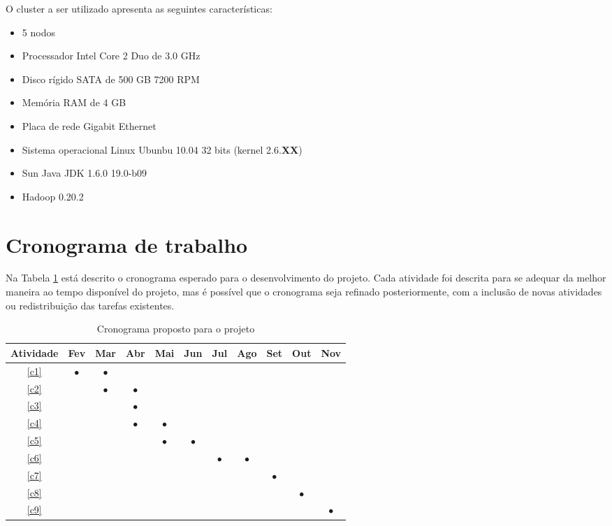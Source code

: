 O cluster a ser utilizado apresenta as seguintes características:
\begin{itemize}
\item 5 nodos
\item Processador Intel Core 2 Duo de 3.0 GHz
\item Disco rígido SATA de 500 GB 7200 RPM
\item Memória RAM de 4 GB
\item Placa de rede Gigabit Ethernet
\item Sistema operacional Linux Ubunbu 10.04 32 bits (kernel 2.6.\textbf{XX})
\item Sun Java JDK 1.6.0 19.0-b09 
\item Hadoop 0.20.2
\end{itemize}

\section{Cronograma de trabalho}

Na Tabela \ref{tab:cronograma} está descrito o cronograma esperado para o desenvolvimento do projeto. Cada atividade foi descrita para se adequar da melhor maneira ao tempo disponível do projeto, mas é possível que o cronograma seja refinado posteriormente, com a inclusão de novas atividades ou redistribuição das tarefas existentes. 

\begin{table}[h]
\begin{center}
\renewcommand{\arraystretch}{1}
\setlength\tabcolsep{3pt}

\begin{tabular}{| c | c | c | c | c | c | c | c | c | c | c |}
\hline
Atividade &Fev &Mar &Abr &Mai &Jun &Jul &Ago &Set &Out &Nov \\ \hline \hline

\ref{c1}   &$\bullet$ &$\bullet$ & & & & & & & & \\ \hline
\ref{c2}   & &$\bullet$ &$\bullet$ & & & & & & & \\ \hline
\ref{c3}   & & &$\bullet$ & & & & & & & \\ \hline
\ref{c4}   & & &$\bullet$ &$\bullet$ & & & & & & \\ \hline
\ref{c5}   & & & &$\bullet$ &$\bullet$ & & & & & \\ \hline
\ref{c6}   & & & & & &$\bullet$ &$\bullet$ & & & \\ \hline
\ref{c7}   & & & & & & & &$\bullet$ & & \\ \hline
\ref{c8}   & & & & & & & & &$\bullet$ & \\ \hline
\ref{c9}   & & & & & & & & & &$\bullet$ \\ \hline

\hline
\end{tabular}

\caption{Cronograma proposto para o projeto}
\end{center}
\label{tab:cronograma}
\end{table}

